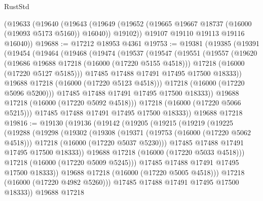 \begin{lexlean}{RustStd}
\begin{coremodule}
{\begin{coremodule}
{{{{{{{{{{{{{{{{{{{{{{{{{{{{{{{{{{{{{{{{{{{{{{{{{{{{{{{{{{{{    (@19633
      (@19640
        (@19643
          (@19649 (@19652 (@19665 @19667 @18737 (@16000 (@19093 @5173 @5160)) @16040)) @19102))
        @19107
        @19110
        @19113
        @19116
        @16040))
@19688 := @17212 @18953 @4361
@19753 := @19381
    (@19385
      (@19391
        (@19454
          (@19464
            (@19468
              (@19474
                (@19537
                  (@19547
                    (@19551
                      (@19557
                        (@19620
                          (@19686 @19688 @17218 (@16000 (@17220 @5155 @4518)))
                          @17218
                          (@16000 (@17220 @5127 @5185)))
                        @17485
                        @17488
                        @17491
                        @17495
                        @17500
                        @18333))
                    @19688
                    @17218
                    (@16000 (@17220 @5123 @4518)))
                  @17218
                  (@16000 (@17220 @5096 @5200)))
                @17485
                @17488
                @17491
                @17495
                @17500
                @18333))
            @19688
            @17218
            (@16000 (@17220 @5092 @4518)))
          @17218
          (@16000 (@17220 @5066 @5215)))
        @17485
        @17488
        @17491
        @17495
        @17500
        @18333))
    @19688
    @17218
@19816 := @19130
    (@19136
      (@19142
        (@19205
          (@19215
            (@19219
              (@19225
                (@19288
                  (@19298
                    (@19302
                      (@19308
                        (@19371
                          (@19753 (@16000 (@17220 @5062 @4518)))
                          @17218
                          (@16000 (@17220 @5037 @5230)))
                        @17485
                        @17488
                        @17491
                        @17495
                        @17500
                        @18333))
                    @19688
                    @17218
                    (@16000 (@17220 @5033 @4518)))
                  @17218
                  (@16000 (@17220 @5009 @5245)))
                @17485
                @17488
                @17491
                @17495
                @17500
                @18333))
            @19688
            @17218
            (@16000 (@17220 @5005 @4518)))
          @17218
          (@16000 (@17220 @4982 @5260)))
        @17485
        @17488
        @17491
        @17495
        @17500
        @18333))
    @19688
    @17218
}}}}}}}}}}}}}}}}}}}}}}}}}}}}}}}}}}}}}}}}}}}}}}}}}}}}}}}}}}}}
\end{coremodule}}
\end{coremodule}
\end{lexlean}
